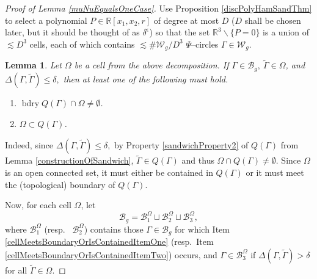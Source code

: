\documentclass[reqno]{amsart}
\newtheorem{lem}[thm]{Lemma}
\theoremstyle{definition}
\theoremstyle{remark}
\theoremstyle{remark}
\newcommand{\RR}{\mathbb{R}}
\newcommand{\WC}{\mathcal W}
\newcommand{\BC}{\mathcal B}
\newcommand{\bdry}{\operatorname{bdry}}
\begin{document}
\begin{proof}[Proof of Lemma \ref{muNuEqualsOneCase}]
Use Proposition \ref{discPolyHamSandThm} to select a polynomial $P\in\RR[x_1,x_2,r]$ of degree at most $D$ ($D$ shall be chosen later, but it should be thought of as $\delta^{\epsilon}$) so that the set $\RR^3\backslash\{P=0\}$ is a union of $\lesssim D^3$ cells, each of which contains $\lesssim \#\WC_g /D^3$ $\Psi$--circles $\Gamma\in\WC_g$.
%
\begin{lem}\label{cellMeetsBoundaryOrIsContained}
Let $\Omega$ be a cell from the above decomposition. If $\Gamma\in\BC_g,\ \tilde\Gamma\in\Omega$, and $\Delta(\Gamma,\tilde\Gamma)\leq\delta,$ then at least one of the following must hold.
\begin{enumerate}[label=(\roman{*}), ref=(\roman{*})]
 \item\label{cellMeetsBoundaryOrIsContainedItemOne} $\bdry Q(\Gamma)\cap\Omega\neq\emptyset$.
 \item\label{cellMeetsBoundaryOrIsContainedItemTwo} $\Omega\subset Q(\Gamma)$.
\end{enumerate}
\end{lem}

Indeed, since $\Delta(\Gamma,\tilde\Gamma)\leq\delta,$ by Property \ref{sandwichProperty2} of $Q(\Gamma)$ from Lemma \ref{constructionOfSandwich}, $\tilde\Gamma\in Q(\Gamma)$ and thus $\Omega\cap Q(\Gamma)\neq\emptyset$. Since $\Omega$ is an open connected set, it must either be contained in $Q(\Gamma)$ or it must meet the (topological) boundary of $Q(\Gamma)$.


Now, for each cell $\Omega$, let
\begin{equation*}
\BC_g = \BC^\Omega_1\sqcup\BC^\Omega_2\sqcup\BC^\Omega_3,
\end{equation*}
 where $\BC^\Omega_1$ (resp.~ $\BC^\Omega_2$) contains those $\Gamma\in\BC_g$ for which Item \ref{cellMeetsBoundaryOrIsContainedItemOne} (resp.~Item \ref{cellMeetsBoundaryOrIsContainedItemTwo}) occurs, and $\Gamma\in\BC^\Omega_3$ if $\Delta(\Gamma,\tilde\Gamma)>\delta$ for all $\tilde\Gamma\in\Omega$.


\end{proof}
\end{document}
